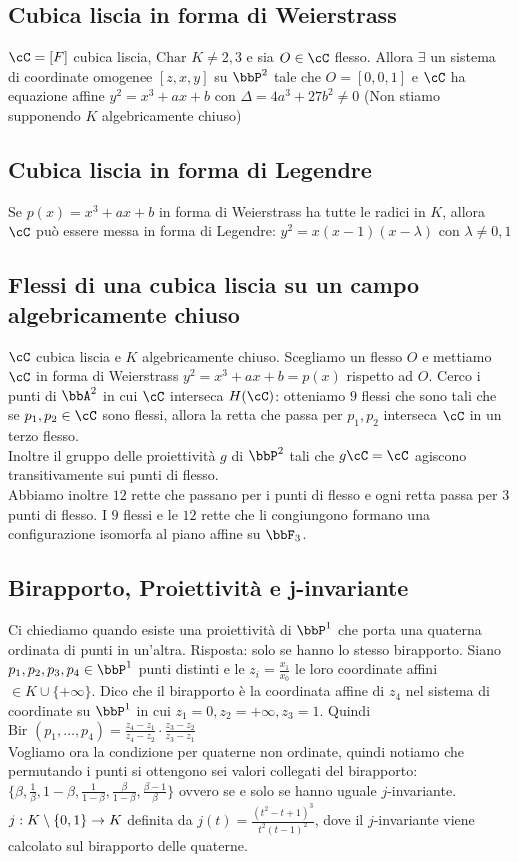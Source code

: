 \documentclass[a4paper,NoNotes,GeneralMath]{stdmdoc}
\newcommand{\Char}{\text{Char }}
\begin{document}
	\subsection*{Cubica liscia in forma di Weierstrass}
	$\cC = [F]$ cubica liscia, $\Char K \neq 2,3$ e sia $O \in \cC$ flesso. Allora $\exists$ un sistema di coordinate omogenee $[z, x, y]$ su $\bbP^2$ tale che $O = [0, 0, 1]$ e $\cC$ ha equazione affine $y^2 = x^3 + ax + b$ con $\Delta = 4 a^3 + 27 b^2 \neq 0$ (Non stiamo supponendo $K$ algebricamente chiuso)
	
	\subsection*{Cubica liscia in forma di Legendre}
	Se $p(x) = x^3 + ax + b$ in forma di Weierstrass ha tutte le radici in $K$, allora $\cC$ può essere messa in forma di Legendre: $y^2 = x(x-1)(x-\lambda)$ con $\lambda \neq 0,1$
	
	\subsection*{Flessi di una cubica liscia su un campo algebricamente chiuso}
	$\cC$ cubica liscia e $K$ algebricamente chiuso. Scegliamo un flesso $O$ e mettiamo $\cC$ in forma di Weierstrass $y^2 = x^3 + ax + b = p(x)$ rispetto ad $O$. Cerco i punti di $\bbA^2$ in cui $\cC$ interseca $H(\cC)$: otteniamo $9$ flessi che sono tali che se $p_1, p_2 \in \cC$ sono flessi, allora la retta che passa per $p_1, p_2$ interseca $\cC$ in un terzo flesso. \\
	Inoltre il gruppo delle proiettività $g$ di $\bbP^2$ tali che $g \cC = \cC$ agiscono transitivamente sui punti di flesso. \\
	Abbiamo inoltre $12$ rette che passano per i punti di flesso e ogni retta passa per $3$ punti di flesso. I $9$ flessi e le $12$ rette che li congiungono formano una configurazione isomorfa al piano affine su $\bbF_3$.
	
	\subsection*{Birapporto, Proiettività e j-invariante}
	Ci chiediamo quando esiste una proiettività di $\bbP^1$ che porta una quaterna ordinata di punti in un'altra. Risposta: solo se hanno lo stesso birapporto. Siano $p_1, p_2, p_3, p_4 \in \bbP^1$ punti distinti e le $z_i = \frac{x_1}{x_0}$ le loro coordinate affini $\in K \cup \{ +\infty \}$. Dico che il birapporto è la coordinata affine di $z_4$ nel sistema di coordinate su $\bbP^1$ in cui $z_1 = 0, z_2 = +\infty, z_3 = 1$. Quindi $\text{Bir }(p_1, \ldots, p_4) = \frac{z_4 - z_1}{z_4 - z_2} \cdot \frac{z_3 - z_2}{z_3 - z_1}$ \\
	Vogliamo ora la condizione per quaterne non ordinate, quindi notiamo che permutando i punti si ottengono sei valori collegati del birapporto: $\{ \beta, \frac{1}{\beta}, 1-\beta , \frac{1}{1-\beta}, \frac{\beta}{1-\beta}, \frac{\beta - 1}{\beta} \}$ ovvero se e solo se hanno uguale $j$-invariante. $j: K \setminus \{0, 1\} \rightarrow K$ definita da $j(t) = \frac{(t^2 - t + 1)^3}{t^2 (t-1)^2}$, dove il $j$-invariante viene calcolato sul birapporto delle quaterne.
\end{document}
